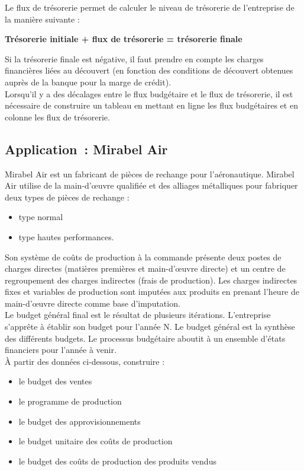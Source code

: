 \documentclass{kaobook}
\begin{document}
Le flux de trésorerie permet de calculer le niveau de trésorerie de l'entreprise de la manière suivante :\\
\begin{center}
\textbf{Trésorerie initiale + flux de trésorerie = trésorerie finale}\\
\end{center}
Si la trésorerie finale est négative, il faut prendre en compte les charges financières liées au découvert (en fonction des conditions de découvert obtenues auprès de la banque pour la marge de crédit).\\
Lorsqu'il y a des décalages entre le flux budgétaire et le flux de trésorerie, il est nécessaire de construire un tableau en mettant en ligne les flux budgétaires et en colonne les flux de trésorerie.\\
\subsection{Application : Mirabel Air}
\label{sec:org6da94f6}

Mirabel Air est un fabricant de pièces de rechange pour l’aéronautique. Mirabel Air utilise de la main-d’œuvre qualifiée et des alliages métalliques pour fabriquer deux types de pièces de rechange :\\
\begin{itemize}
\item type normal\\
\item type hautes performances.\\
\end{itemize}

Son système de coûts de production à la commande présente deux postes de charges directes (matières premières et main-d’œuvre directe) et un centre de regroupement des charges indirectes (frais de production). Les charges indirectes fixes et variables de production sont imputées aux produits en prenant l’heure de main-d’œuvre directe comme base d’imputation.\\

Le budget général final est le résultat de plusieurs itérations. L’entreprise s’apprête à établir son budget pour l’année N. Le budget général est la synthèse des différents budgets. Le processus budgétaire aboutit à un ensemble d’états financiers pour l’année à venir.\\

À partir des données ci-dessous, construire :\\
\begin{itemize}
\item le budget des ventes\\
\item le programme de production\\
\item le budget des approvisionnements\\
\item le budget unitaire des coûts de production\\
\item le budget des coûts de production des produits vendus\\
\end{itemize}
\end{document}
